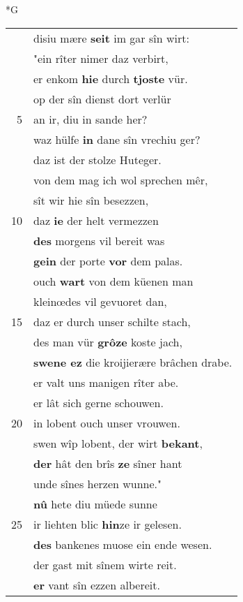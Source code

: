 \documentclass[8pt,a4paper,notitlepage]{article}
\begin{document}
\newpage
\begin{table}[ht]
\begin{minipage}[t]{0.5\linewidth}
\small
\begin{center}*G
\end{center}
\begin{tabular}{rl}
 & disiu mære \textbf{seit} im gar sîn wirt:\\ 
 & "ein rîter nimer daz verbirt,\\ 
 & er enkom \textbf{hie} durch \textbf{tjoste} vür.\\ 
 & op der sîn dienst dort verlür\\ 
5 & an ir, diu in sande her?\\ 
 & waz hülfe \textbf{in} dane sîn vrechiu ger?\\ 
 & daz ist der stolze Huteger.\\ 
 & von dem mag ich wol sprechen mêr,\\ 
 & sît wir hie sîn besezzen,\\ 
10 & daz \textbf{ie} der helt vermezzen\\ 
 & \textbf{des} morgens vil bereit was\\ 
 & \textbf{gein} der porte \textbf{vor} dem palas.\\ 
 & ouch \textbf{wart} von dem küenen man\\ 
 & kleinœdes vil gevuoret dan,\\ 
15 & daz er durch unser schilte stach,\\ 
 & des man vür \textbf{grôze} koste jach,\\ 
 & \textbf{swene ez} die kroijierære brâchen drabe.\\ 
 & er valt uns manigen rîter abe.\\ 
 & er lât sich gerne schouwen.\\ 
20 & in lobent ouch unser vrouwen.\\ 
 & swen wîp lobent, der wirt \textbf{bekant},\\ 
 & \textbf{der} hât den brîs \textbf{ze} sîner hant\\ 
 & unde sînes herzen wunne."\\ 
 & \textbf{nû} hete diu müede sunne\\ 
25 & ir liehten blic \textbf{hin}ze ir gelesen.\\ 
 & \textbf{des} bankenes muose ein ende wesen.\\ 
 & der gast mit sînem wirte reit.\\ 
 & \textbf{er} vant sîn ezzen albereit.\\ 

\end{tabular}
\end{minipage}
\end{table}
\end{document}
